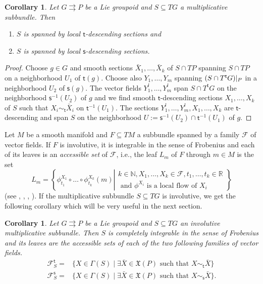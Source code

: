 \documentclass{amsart}
\newtheorem{corollary}[theorem]{Corollary}
\theoremstyle{definition}
\begin{document}
\begin{corollary}
Let $G{{\rightrightarrows}} P$ be a Lie groupoid and $S\subseteq TG$ a multiplicative subbundle. Then 
\begin{enumerate}
\item $S$ is spanned by local ${{\mathsf{t}}}$-descending sections and 
\item $S$ is spanned by local ${{\mathsf{s}}}$-descending sections.
\end{enumerate}
\end{corollary}
\begin{proof}
Choose $g\in G$ and smooth sections $\bar X_1,\ldots,\bar X_k$
of $S\cap TP$ spanning $S\cap TP$ on a neighborhood
$U_1$ of ${{\mathsf{t}}}(g)$. Choose also $Y_1,\ldots,Y_m$ spanning $(S\cap T^{{\mathsf{t}}} G){\arrowvert_{{P}}}$
in a neighborhood $U_2$ of ${{\mathsf{s}}}(g)$.
The vector fields 
$Y_1^l,\ldots,Y_m^l$ span $S\cap T^{{\mathsf{t}}} G$ on the neighborhood ${{\mathsf{s}}}{^{-1}}(U_2)$
of $g$ and we find smooth ${{\mathsf{t}}}$-descending sections 
$X_1,\ldots,X_k$ of $S$ such that $X_i\sim_{{\mathsf{t}}}\bar X_i$ on ${{\mathsf{t}}}{^{-1}}(U_1)$.
The sections $Y_1^l,\ldots,Y_m^l,X_1,\ldots,X_k$ 
are ${{\mathsf{t}}}$-descending and span $S$ on the neighborhood $U:={{\mathsf{s}}}{^{-1}}(U_2)\cap 
{{\mathsf{t}}}{^{-1}}(U_1)$ of $g$.
\end{proof}

\medskip

Let $M$ be a smooth manifold and $F\subseteq TM$ a subbundle spanned
by a family $\mathcal F$ of vector fields.
If $F$ is involutive, it is integrable in the sense of Frobenius 
and each of its leaves is an \emph{accessible set}
of $\mathcal F$, i.e.,
the leaf $L_m$ of $F$ through  $m\in M$
is the set 
$$L_m=\left\{\phi^{X_1}_{t_1}\circ\ldots\circ  \phi^{X_k}_{t_k}(m)\left|
\begin{array}{c}
k\in {\mathbb{N}}, X_1,\ldots, X_k\in\mathcal F, t_1,\ldots,t_k\in {\mathbb{R}}\\
\text{ and } \phi^{X_i} \text{ is a local flow of } X_i
\end{array}\right.\right\}$$
(see \cite{OrRa04}, \cite{Stefan74a}, \cite{Sussmann73}, \cite{Stefan80}).
If the multiplicative subbundle $S\subseteq TG$ is involutive, we get the following corollary
which will be very useful in the next section.
\begin{corollary}\label{accessible-sets}
Let $G{{\rightrightarrows}} P$ be a Lie groupoid and $S\subseteq TG$ an involutive multiplicative
subbundle.
Then $S$ is completely integrable in the sense of Frobenius and its leaves 
are the accessible sets of each of the two following families of vector fields.
\begin{align}
\mathcal F^{{\mathsf{t}}}_S=&\{X\in\Gamma(S)\mid \exists \bar X\in{\mathfrak{X}}(P) \text{ such that } 
X\sim_{{\mathsf{t}}} \bar X\}\label{t_accessible}\\
\mathcal F^{{\mathsf{s}}}_S=&\{X\in\Gamma(S)\mid \exists \bar X\in{\mathfrak{X}}(P) \text{ such that } 
X\sim_{{\mathsf{s}}} \bar X\}\label{s_accessible}.
\end{align}
\end{corollary}
\end{document}
